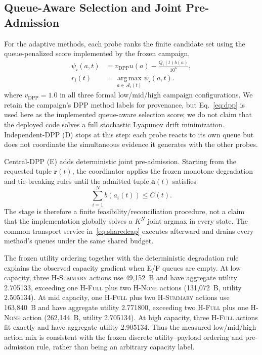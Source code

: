 \documentclass[10pt,journal]{IEEEtran}
\newcommand{\argmax}{\operatorname*{arg\,max}}
\newcommand{\Hnone}{\textsc{H-None}}
\newcommand{\Hsummary}{\textsc{H-Summary}}
\newcommand{\Hfull}{\textsc{H-Full}}
\begin{document}
\subsection{Queue-Aware Selection and Joint Pre-Admission}
For the adaptive methods, each probe ranks the finite candidate set using the queue-penalized score implemented by the frozen campaign,
\begin{equation}
\begin{aligned}
  \psi_i(a,t)&=v_{\mathrm{DPP}}u(a)-\frac{Q_i(t)b(a)}{10^{6}},\\
  r_i(t)&=\argmax_{a\in\mathcal A_i(t)}\psi_i(a,t).
\end{aligned}
  \label{eq:dpp}
\end{equation}
where $v_{\mathrm{DPP}}=1.0$ in all three formal low/mid/high campaign configurations. We retain the campaign's DPP method labels for provenance, but Eq.~\eqref{eq:dpp} is used here as the implemented queue-aware selection score; we do not claim that the deployed code solves a full stochastic Lyapunov drift minimization. Independent-DPP (D) stops at this step: each probe reacts to its own queue but does not coordinate the simultaneous evidence it generates with the other probes.

Central-DPP (E) adds deterministic joint pre-admission. Starting from the requested tuple $\mathbf r(t)$, the coordinator applies the frozen monotone degradation and tie-breaking rules until the admitted tuple $\mathbf a(t)$ satisfies
\begin{equation}
       \sum_{i=1}^{N} b(a_i(t))\le C(t).
 \label{eq:joint}
\end{equation}
The stage is therefore a finite feasibility/reconciliation procedure, not a claim that the implementation globally solves a $K^N$ joint argmax in every state. The common transport service in~\eqref{eq:sharedcap} executes afterward and drains every method's queues under the same shared budget.

The frozen utility ordering together with the deterministic degradation rule explains the observed capacity gradient when E/F queues are empty. At low capacity, three \Hsummary{} actions use 49,152~B and have aggregate utility 2.705133, exceeding one \Hfull{} plus two \Hnone{} actions (131,072~B, utility 2.505134). At mid capacity, one \Hfull{} plus two \Hsummary{} actions use 163,840~B and have aggregate utility 2.771800, exceeding two \Hfull{} plus one \Hnone{} action (262,144~B, utility 2.705134). At high capacity, three \Hfull{} actions fit exactly and have aggregate utility 2.905134. Thus the measured low/mid/high action mix is consistent with the frozen discrete utility--payload ordering and pre-admission rule, rather than being an arbitrary capacity label.
\end{document}
